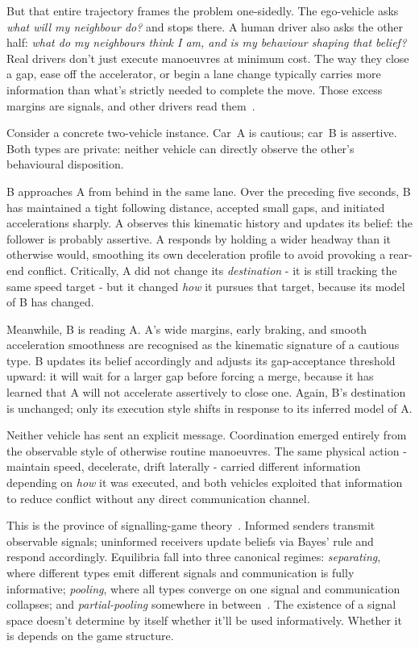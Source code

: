 \documentclass[12pt,a4paper]{article}
\begin{document}
But that entire trajectory frames the problem one-sidedly. The ego-vehicle asks \textit{what
will my neighbour do?} and stops there. A human driver also asks the other half:
\textit{what do my neighbours think I am, and is my behaviour shaping that belief?}
Real drivers don't just execute manoeuvres at minimum cost. The way they close a gap, ease
off the accelerator, or begin a lane change typically carries more information than what's strictly
needed to complete the move. Those excess margins are signals, and other
drivers read them~\cite{fox2019chicken,risto2017human,wang2020driver}.

Consider a concrete two-vehicle instance. Car~A is cautious; car~B is assertive. Both
types are private: neither vehicle can directly observe the other's behavioural disposition.

B approaches A from behind in the same lane. Over the preceding five seconds, B has
maintained a tight following distance, accepted small gaps, and initiated accelerations
sharply. A observes this kinematic history and updates its belief: the follower is probably
assertive. A responds by holding a wider headway than it otherwise would, smoothing its
own deceleration profile to avoid provoking a rear-end conflict. Critically, A did not change
its \textit{destination} - it is still tracking the same speed target - but it changed
\textit{how} it pursues that target, because its model of B has changed.

Meanwhile, B is reading A. A's wide margins, early braking, and smooth acceleration
smoothness are recognised as the kinematic signature of a cautious type. B updates its
belief accordingly and adjusts its gap-acceptance threshold upward: it will wait for a
larger gap before forcing a merge, because it has learned that A will not accelerate
assertively to close one. Again, B's destination is unchanged; only its execution style
shifts in response to its inferred model of A.

Neither vehicle has sent an explicit message. Coordination emerged entirely from the
observable style of otherwise routine manoeuvres. The same physical action - maintain
speed, decelerate, drift laterally - carried different information depending on
\textit{how} it was executed, and both vehicles exploited that information to reduce
conflict without any direct communication channel.

This is the province of signalling-game theory~\cite{crawford1982strategic,spence1973job}.
Informed senders transmit observable signals; uninformed receivers update beliefs via Bayes'
rule and respond accordingly. Equilibria fall into three canonical regimes: \textit{separating},
where different types emit different signals and communication is fully informative;
\textit{pooling}, where all types converge on one signal and communication collapses; and
\textit{partial-pooling} somewhere in between~\cite{fudenberg1991game}. The existence of a
signal space doesn't determine by itself whether it'll be used informatively. Whether it is depends
on the game structure.
\end{document}
